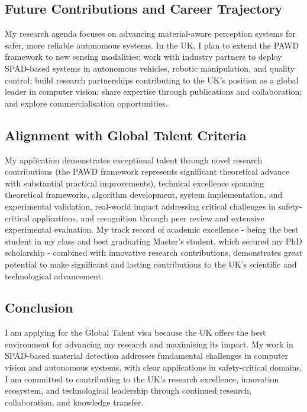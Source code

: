 \documentclass[12pt,a4paper]{article}
\begin{document}
\subsection*{Future Contributions and Career Trajectory}

My research agenda focuses on advancing material-aware perception systems for safer, more reliable autonomous systems. In the UK, I plan to extend the PAWD framework to new sensing modalities; work with industry partners to deploy SPAD-based systems in autonomous vehicles, robotic manipulation, and quality control; build research partnerships contributing to the UK's position as a global leader in computer vision; share expertise through publications and collaboration; and explore commercialisation opportunities.

\subsection*{Alignment with Global Talent Criteria}

My application demonstrates exceptional talent through novel research contributions (the PAWD framework represents significant theoretical advance with substantial practical improvements), technical excellence spanning theoretical frameworks, algorithm development, system implementation, and experimental validation, real-world impact addressing critical challenges in safety-critical applications, and recognition through peer review and extensive experimental evaluation. My track record of academic excellence - being the best student in my class and best graduating Master's student, which secured my PhD scholarship - combined with innovative research contributions, demonstrates great potential to make significant and lasting contributions to the UK's scientific and technological advancement.

\subsection*{Conclusion}

I am applying for the Global Talent visa because the UK offers the best environment for advancing my research and maximising its impact. My work in SPAD-based material detection addresses fundamental challenges in computer vision and autonomous systems, with clear applications in safety-critical domains. I am committed to contributing to the UK's research excellence, innovation ecosystem, and technological leadership through continued research, collaboration, and knowledge transfer.
\end{document}
